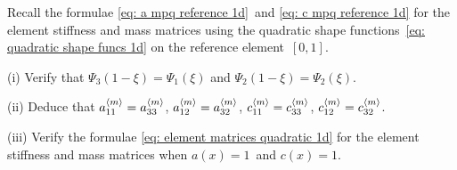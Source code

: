 \begin{Exercises}
\exercise
Recall the formulae \eqref{eq: a mpq reference 1d}~and
\eqref{eq: c mpq reference 1d} for the element stiffness and mass matrices using 
the quadratic shape functions~\eqref{eq: quadratic shape funcs 1d} on the 
reference element~$[0,1]$. 
\begin{description}
\item{(i)} Verify that $\Psi_3(1-\xi)=\Psi_1(\xi)$ and 
$\Psi_2(1-\xi)=\Psi_2(\xi)$.
\item{(ii)} Deduce that
$a^{\langle m\rangle}_{11}=a^{\langle m\rangle}_{33}$, $a^{\langle m\rangle}_{12}=a^{\langle m\rangle}_{32}$,
$c^{\langle m\rangle}_{11}=c^{\langle m\rangle}_{33}$, $c^{\langle m\rangle}_{12}=c^{\langle m\rangle}_{32}$.
\item{(iii)} Verify the formulae \eqref{eq: element matrices quadratic 1d}
for the element stiffness and mass matrices when $a(x)=1$~and $c(x)=1$.
\end{description}

\end{Exercises}
